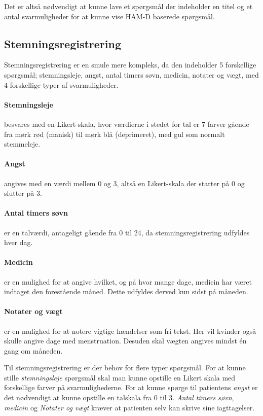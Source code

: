 Det er altså nødvendigt at kunne lave et spørgsmål der indeholder en titel og et antal svarmuligheder for at kunne vise HAM-D baserede spørgsmål.

\subsection{Stemningsregistrering} 
Stemningsregistrering er en smule mere kompleks, da den indeholder 5 forskellige spørgsmål; stemningsleje, angst, antal timers søvn, medicin, notater og vægt, med 4 forskellige typer af svarmuligheder.

\paragraph{Stemningsleje} besvares med en Likert-skala, hvor værdierne i stedet for tal er 7 farver gående fra mørk rød (manisk) til mørk blå (deprimeret), med gul som normalt stemmeleje.

\paragraph{Angst} angives med en værdi mellem 0 og 3, altså en Likert-skala der starter på 0 og slutter på 3.

\paragraph{Antal timers søvn} er en talværdi, antageligt gående fra 0 til 24, da stemningsregistrering udfyldes hver dag.

\paragraph{Medicin} er en mulighed for at angive hvilket, og på hvor mange dage, medicin har været indtaget den forestående måned.
Dette udfyldes derved kun sidst på måneden.

\paragraph{Notater og vægt} er en mulighed for at notere vigtige hændelser som fri tekst.
Her vil kvinder også skulle angive dage med menstruation.
Desuden skal vægten angives mindst én gang om måneden.

Til stemningsregistrering er der behov for flere typer spørgsmål.
For at kunne stille \emph{stemningsleje} spørgsmål skal man kunne opstille en Likert skala med forskellige farver på svarmulighederne.
For at kunne spørge til patientens \emph{angst} er det nødvendigt at kunne opstille en talskala fra 0 til 3.
\emph{Antal timers søvn}, \emph{medicin} og \emph{Notater og vægt} kræver at patienten selv kan skrive sine iagttagelser.

